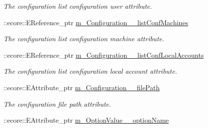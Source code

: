 \begin{DoxyCompactItemize}
\begin{DoxyCompactList}\small\item\em The configuration list configuration user attribute. \item\end{DoxyCompactList}\item 
\hypertarget{classUMS__Data_1_1UMS__DataPackage_a036d42b826a02384f7e98f2a556e87fd}{
::ecore::EReference\_\-ptr \hyperlink{classUMS__Data_1_1UMS__DataPackage_a036d42b826a02384f7e98f2a556e87fd}{m\_\-Configuration\_\-\_\-listConfMachines}}
\label{classUMS__Data_1_1UMS__DataPackage_a036d42b826a02384f7e98f2a556e87fd}

\begin{DoxyCompactList}\small\item\em The configuration list configuration machine attribute. \item\end{DoxyCompactList}\item 
\hypertarget{classUMS__Data_1_1UMS__DataPackage_acfc9b19feb16297ec0bbfe0df8861801}{
::ecore::EReference\_\-ptr \hyperlink{classUMS__Data_1_1UMS__DataPackage_acfc9b19feb16297ec0bbfe0df8861801}{m\_\-Configuration\_\-\_\-listConfLocalAccounts}}
\label{classUMS__Data_1_1UMS__DataPackage_acfc9b19feb16297ec0bbfe0df8861801}

\begin{DoxyCompactList}\small\item\em The configuration list configuration local account attribute. \item\end{DoxyCompactList}\item 
\hypertarget{classUMS__Data_1_1UMS__DataPackage_a920d5cf0cef56c74876fea811f94db49}{
::ecore::EAttribute\_\-ptr \hyperlink{classUMS__Data_1_1UMS__DataPackage_a920d5cf0cef56c74876fea811f94db49}{m\_\-Configuration\_\-\_\-filePath}}
\label{classUMS__Data_1_1UMS__DataPackage_a920d5cf0cef56c74876fea811f94db49}

\begin{DoxyCompactList}\small\item\em The configuration file path attribute. \item\end{DoxyCompactList}\item 
\hypertarget{classUMS__Data_1_1UMS__DataPackage_a3a4c33668b970f193420bc685a4491d2}{
::ecore::EAttribute\_\-ptr \hyperlink{classUMS__Data_1_1UMS__DataPackage_a3a4c33668b970f193420bc685a4491d2}{m\_\-OptionValue\_\-\_\-optionName}}
\label{classUMS__Data_1_1UMS__DataPackage_a3a4c33668b970f193420bc685a4491d2}


\end{DoxyCompactItemize}
